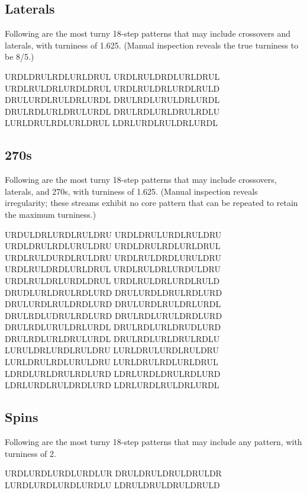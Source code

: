 \documentclass[10pt]{sigplanconf}
\begin{document}
\subsection{Laterals}

Following are the most turny 18-step patterns that may include crossovers and laterals, with turniness of 1.625. (Manual inspection reveals the true turniness to be 8/5.)

\noindent
URDLDRULRDLURLDRUL
URDLRULDRDLURLDRUL
URDLRULDRLURDLDRUL
URDLRULDRLURDLRULD
DRULURDLRULDRLURDL
DRULRDLURULDRLURDL
DRULRDLURLDRULURDL
DRULRDLURLDRULRDLU
LURLDRULRDLURLDRUL
LDRLURDLRULDRLURDL

\subsection{270s}

Following are the most turny 18-step patterns that may include crossovers, laterals, and 270s, with turniness of 1.625.
(Manual inspection reveals irregularity; these streams exhibit no core pattern that can be repeated to retain the maximum turniness.)

\noindent
URDULDRLURDLRULDRU
URDLDRULURDLRULDRU
URDLDRULRDLURULDRU
URDLDRULRDLURLDRUL
URDLRULDURDLRULDRU
URDLRULDRDLURULDRU
URDLRULDRDLURLDRUL
URDLRULDRLURDULDRU
URDLRULDRLURDLDRUL
URDLRULDRLURDLRULD
DRUDLURLDRULRDLURD
DRULURDLDRULRDLURD
DRULURDLRULDRDLURD
DRULURDLRULDRLURDL
DRULRDLUDRULRDLURD
DRULRDLURULDRDLURD
DRULRDLURULDRLURDL
DRULRDLURLDRUDLURD
DRULRDLURLDRULURDL
DRULRDLURLDRULRDLU
LURULDRLURDLRULDRU
LURLDRULURDLRULDRU
LURLDRULRDLURULDRU
LURLDRULRDLURLDRUL \\
LDRDLURLDRULRDLURD
LDRLURDLDRULRDLURD
LDRLURDLRULDRDLURD
LDRLURDLRULDRLURDL

\subsection{Spins}

Following are the most turny 18-step patterns that may include any pattern, with turniness of 2.

\noindent
URDLURDLURDLURDLUR
DRULDRULDRULDRULDR
LURDLURDLURDLURDLU
LDRULDRULDRULDRULD
\end{document}
